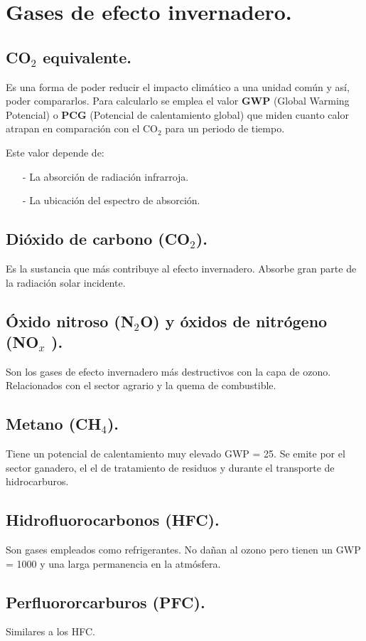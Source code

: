 \section{Gases de efecto invernadero.}
\subsection{CO$_2$ equivalente.}
Es una forma de poder reducir el impacto climático a una unidad común y así, poder compararlos. Para calcularlo se emplea el valor \textbf{GWP} (Global Warming Potencial) o \textbf{PCG} (Potencial de calentamiento global) que miden cuanto calor atrapan en comparación con el CO$_2$ para un periodo de tiempo. 


Este valor depende de:
\begin{itemize}
	\item [-] La absorción de radiación infrarroja.
	\item [-] La ubicación del espectro de absorción.
\end{itemize}
\subsection{Dióxido de carbono (CO$_2$).}
Es la sustancia que más contribuye al efecto invernadero. Absorbe gran parte de la radiación solar incidente.
\subsection{Óxido nitroso (N$_2$O) y óxidos de nitrógeno (NO$_x$ ).}
Son los gases de efecto invernadero más destructivos con la capa de ozono. Relacionados con el sector agrario y la quema de combustible.
\subsection{Metano (CH$_4$).}
Tiene un potencial de calentamiento muy elevado GWP = 25. Se emite por el sector ganadero, el el de tratamiento de residuos y durante el transporte de hidrocarburos.
\subsection{Hidrofluorocarbonos (HFC).}
Son gases empleados como refrigerantes. No dañan al ozono pero tienen un GWP = 1000 y una larga permanencia en la atmósfera.
\subsection{Perfluororcarburos (PFC).}
Similares a los HFC.
